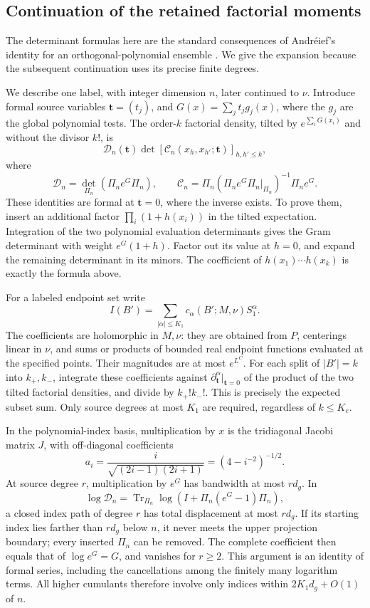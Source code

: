 \subsection{Continuation of the retained factorial moments}

The determinant formulas here are the standard consequences of
Andr\'eief's identity for an orthogonal-polynomial ensemble
\cite[equations (1.3), (3.1), and Section 5]{TracyWidom1998}.
We give the expansion because the subsequent
continuation uses its precise finite degrees.

We describe one label, with integer dimension \(n\), later continued
to \(\nu\). Introduce formal source variables \(\mathbf t=(t_j)\),
and \(G(x)=\sum_jt_jg_j(x)\), where the \(g_j\) are the global
polynomial tests. The order-\(k\) factorial density, tilted by
\(e^{\sum_iG(x_i)}\) and without the divisor \(k!\), is
\[
 \mathcal D_n(\mathbf t)
       \det[\mathcal C_n(x_h,x_{h'};\mathbf t)]_{h,h'\le k},
\]
where
\[
 \mathcal D_n=\det_{\Pi_n}(\Pi_ne^G\Pi_n),\qquad
 \mathcal C_n=\Pi_n(\Pi_ne^G\Pi_n|_{\Pi_n})^{-1}\Pi_ne^G.
\]
These identities are formal at \(\mathbf t=0\), where the inverse
exists. To prove them, insert an additional factor
\(\prod_i(1+h(x_i))\) in the tilted expectation. Integration of the
two polynomial evaluation determinants gives the Gram determinant
with weight \(e^G(1+h)\). Factor out its value at \(h=0\), and
expand the remaining determinant in its minors. The coefficient of
\(h(x_1)\cdots h(x_k)\) is exactly the formula above.

For a labeled endpoint set write
\[
 I(B')=\sum_{|\alpha|\le K_1}
        c_\alpha(B';M,\nu)S_1^\alpha.
\]
The coefficients are holomorphic in \(M,\nu\): they are obtained
from \(P\), centerings linear in \(\nu\), and sums or products of
bounded real endpoint functions evaluated at the specified points.
Their magnitudes are at most \(e^{L^C}\). For each split of
\(|B'|=k\) into \(k_+,k_-\), integrate these coefficients against
\(\partial_{\mathbf t}^{\alpha}|_{\mathbf t=0}\) of the product
of the two tilted factorial densities, and divide by \(k_+!k_-!\).
This is precisely the expected subset sum. Only source degrees at
most \(K_1\) are required, regardless of \(k\le K_e\).

In the polynomial-index basis, multiplication by \(x\) is the
tridiagonal Jacobi matrix \(J\), with off-diagonal coefficients
\[
 a_i=\frac{i}{\sqrt{(2i-1)(2i+1)}}
       =(4-i^{-2})^{-1/2}.
\]
At source degree \(r\), multiplication by \(e^G\) has bandwidth at
most \(rd_g\). In
\[
 \log\mathcal D_n
   =\operatorname{Tr}_{\Pi_n}
         \log(I+\Pi_n(e^G-1)\Pi_n),
\]
a closed index path of degree \(r\) has total displacement at most
\(rd_g\). If its starting index lies farther than \(rd_g\) below
\(n\), it never meets the upper projection boundary; every inserted
\(\Pi_n\) can be removed. The complete coefficient then equals
that of \(\log e^G=G\), and vanishes for \(r\ge2\). This argument
is an identity of formal series, including the cancellations among
the finitely many logarithm terms. All higher cumulants therefore
involve only indices within \(2K_1d_g+O(1)\) of \(n\).

